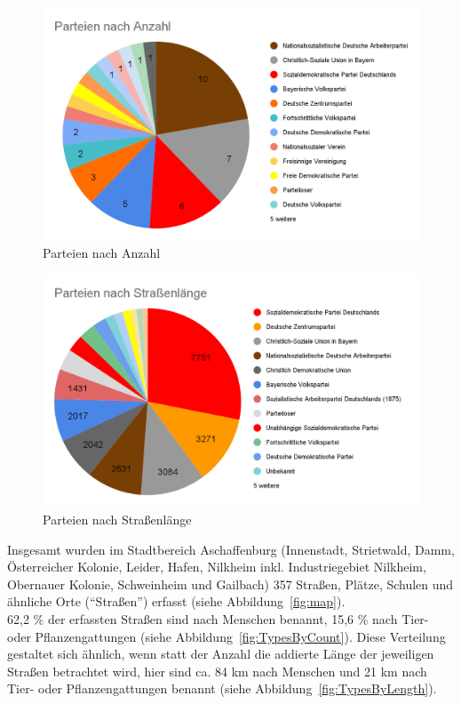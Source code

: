 \documentclass[ngerman,twocolumn,showpacs,%
  nofootinbib,aps,superscriptaddress,%
  eqsecnum,prd,notitlepage,showkeys,10pt,report]{revtex4-2}
\begin{document}
\begin{figure}
\centering
\includegraphics[width=1\linewidth]{9.png}
\caption{Parteien nach Anzahl}
\label{fig:PartiesByCount}
\end{figure}
\begin{figure}
\centering
\includegraphics[width=1\linewidth]{10.png}
\caption{Parteien nach Straßenlänge}
\label{fig:PartiesByLength}
\end{figure}

Insgesamt wurden im Stadtbereich Aschaffenburg (Innenstadt, Strietwald, Damm,
Österreicher Kolonie, Leider, Hafen, Nilkheim inkl. Industriegebiet Nilkheim, Obernauer
Kolonie, Schweinheim und Gailbach) 357 Straßen, Plätze, Schulen und ähnliche Orte
(“Straßen”) erfasst (siehe Abbildung~\ref{fig:map}).\\
62,2 \% der erfassten Straßen sind nach Menschen benannt, 15,6 \% nach Tier- oder
Pflanzengattungen (siehe Abbildung~\ref{fig:TypesByCount}). Diese Verteilung gestaltet sich ähnlich, wenn statt der Anzahl die
addierte Länge der jeweiligen Straßen betrachtet wird, hier sind ca. 84 km nach Menschen
und 21 km nach Tier- oder Pflanzengattungen benannt (siehe Abbildung~\ref{fig:TypesByLength}).
\end{document}
